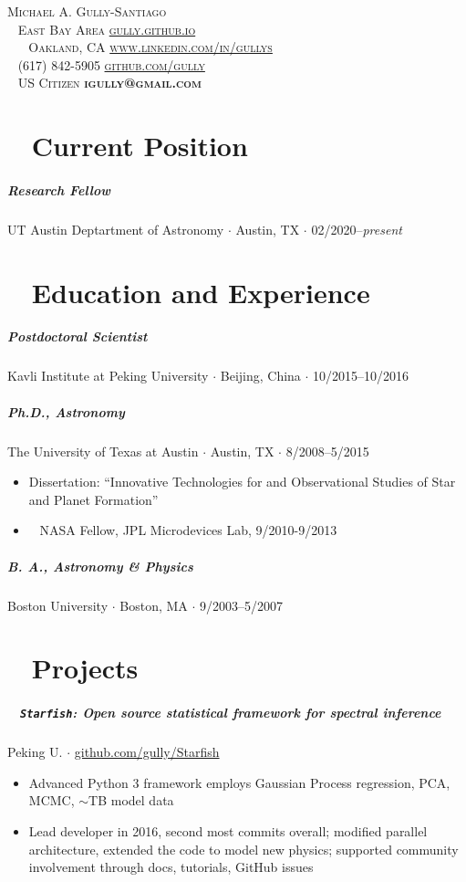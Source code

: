 \documentclass[10pt,letterpaper]{article}
\newcommand{\namestyle}{\Huge \scshape}
\newcommand{\addressstyle}{\color{addresscolor}  \footnotesize \sffamily \upshape}
\begin{document}
\begin{flushleft}
    \namestyle Michael A. Gully-Santiago \\[0.3em]
    \addressstyle 
    \faMapMarker ~ East Bay Area  \hfill \url{gully.github.io} ~ \faLink \\
    ~ ~ Oakland, CA  \hfill  \url{www.linkedin.com/in/gullys} ~ \faLinkedin \\
    \faPhone ~ (617) 842-5905 \hfill \url{github.com/gully} ~ \faGithub \\
    \faGlobe ~ US Citizen \hfill \textbf{igully@gmail.com} ~ \faInbox\\

\end{flushleft}

\small

\section*{\faToggleOn ~ Current Position}

\subparagraph{Research Fellow}
UT Austin Deptartment of Astronomy $\cdot$ Austin, TX $\cdot$ 02/2020--\emph{present}

\section*{\faUniversity ~ Education and Experience}

\subparagraph{Postdoctoral Scientist}
Kavli Institute at Peking University $\cdot$ Beijing, China $\cdot$ 10/2015--10/2016

\subparagraph{\textbf{Ph.D}., Astronomy}
The University of Texas at Austin $\cdot$ Austin, TX $\cdot$ 8/2008--5/2015
\begin{itemize}
    \item Dissertation: ``Innovative Technologies for and Observational Studies of Star and Planet Formation''
    \item \faRocket ~ NASA Fellow, JPL Microdevices Lab, 9/2010-9/2013
\end{itemize}

\subparagraph{\textbf{B. A.}, Astronomy \& Physics}
Boston University $\cdot$ Boston, MA $\cdot$ 9/2003--5/2007

\section*{\faChartLine ~ Projects}

\subparagraph{\faGit* ~ \texttt{Starfish}: Open source statistical framework for spectral inference}
Peking U. $\cdot$ \href{https://github.com/gully/Starfish}{github.com/gully/Starfish}
\begin{itemize}
    \item Advanced Python 3 framework employs Gaussian Process regression, PCA, MCMC, $\sim$TB model data
    \item Lead developer in 2016, second most commits overall; modified parallel architecture, extended the code to model new physics; supported community involvement through docs, tutorials, GitHub issues
\end{itemize}
\end{document}
